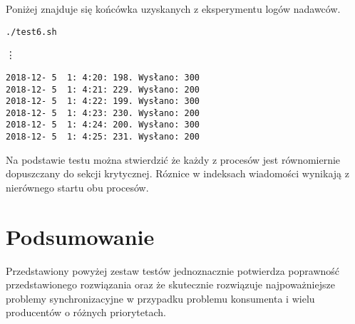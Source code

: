 \documentclass{mwrep}
\begin{document}
Poniżej znajduje się końcówka uzyskanych z eksperymentu logów nadawców.

\begin{verbatim}
./test6.sh
\end{verbatim}
\vdots
\begin{verbatim}
2018-12- 5  1: 4:20: 198. Wysłano: 300
2018-12- 5  1: 4:21: 229. Wysłano: 200
2018-12- 5  1: 4:22: 199. Wysłano: 300
2018-12- 5  1: 4:23: 230. Wysłano: 200
2018-12- 5  1: 4:24: 200. Wysłano: 300
2018-12- 5  1: 4:25: 231. Wysłano: 200
\end{verbatim}

Na podstawie testu można stwierdzić że każdy z procesów jest równomiernie dopuszczany do sekcji krytycznej.
Róznice w indeksach wiadomości wynikają z nierównego startu obu procesów.

\section{Podsumowanie}
Przedstawiony powyżej zestaw testów jednoznacznie potwierdza poprawność przedstawionego rozwiązania oraz że 
skutecznie rozwiązuje najpoważniejsze problemy synchronizacyjne w przypadku problemu konsumenta i wielu producentów o
różnych priorytetach.
\end{document}
